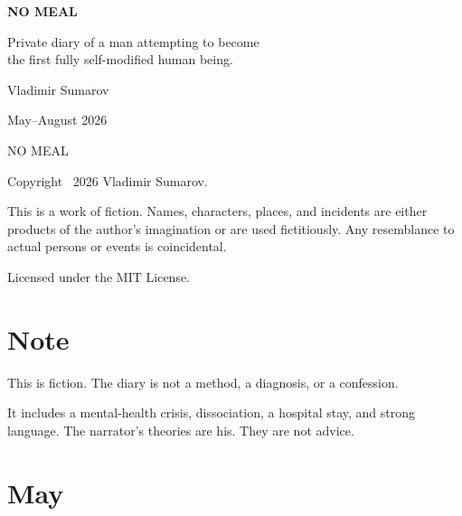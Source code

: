 \documentclass[11pt,oneside]{book}
\begin{document}
\color{ink}

\begin{titlepage}
\thispagestyle{empty}
\vspace*{0.38\textheight}
{\sffamily\bfseries\fontsize{48}{50}\selectfont NO MEAL\par}
\vspace{1.05em}
{\large
Private diary of a man attempting to become\\
the first fully self-modified human being.\par}
\vfill
{\sffamily Vladimir Sumarov\par}
\vspace{0.35em}
{\sffamily\footnotesize\color{quiet} May--August 2026\par}
\vspace{1.4em}
\end{titlepage}

\clearpage
\thispagestyle{empty}
\vspace*{\fill}
{\sffamily\footnotesize\color{quiet} NO MEAL\par}
\vspace{0.75em}
{\footnotesize
Copyright \textcopyright\ 2026 Vladimir Sumarov.\par}
\vspace{0.65em}
{\footnotesize
This is a work of fiction. Names, characters, places, and incidents
are either products of the author's imagination or are used
fictitiously. Any resemblance to actual persons or events is
coincidental.\par}
\vspace{0.65em}
{\footnotesize
Licensed under the MIT License.\par}
\vspace*{\fill}
\clearpage

\tableofcontents
\clearpage

\chapter*{Note}

This is fiction. The diary is not a method, a diagnosis, or a confession.

It includes a mental-health crisis, dissociation, a hospital stay, and strong language. The narrator's theories are his. They are not advice.

\chapter*{May}
\end{document}
